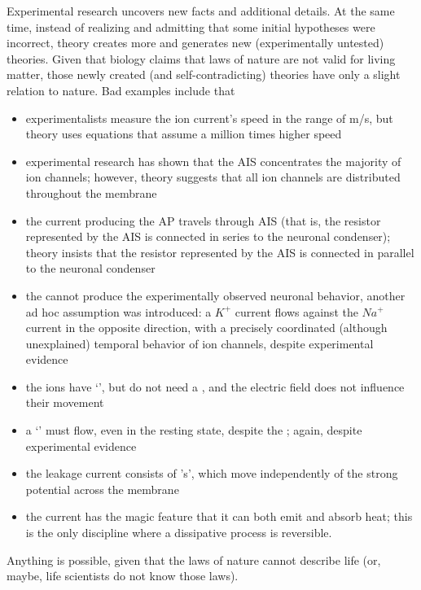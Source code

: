 Experimental research uncovers new facts and additional details. At the same time, instead of realizing and admitting that some initial hypotheses were incorrect,
theory creates more  and generates new (experimentally untested) theories. Given that biology claims that laws of nature are not valid for living matter, those newly created (and self-contradicting) theories have only a slight relation to nature. Bad examples include that
\begin{itemize}
\item experimentalists measure the ion current’s speed in the range of m/s, but theory uses equations that assume a million times higher speed
\item experimental research has shown that the \gls{AIS} concentrates the majority of ion channels; however, theory suggests that all ion channels are distributed throughout the membrane
\item the current producing the \gls{AP} travels through \gls{AIS} (that is, the resistor represented by the \gls{AIS} is connected in series to the neuronal condenser); theory insists that the resistor represented by the \gls{AIS} is connected in parallel to the neuronal condenser
\item the  cannot produce the experimentally observed neuronal behavior,
another ad hoc assumption was introduced: a $K^+$ current flows against the $Na^+$ current in the opposite direction,
 with a precisely coordinated (although unexplained) temporal behavior of ion channels, despite experimental evidence
\item the ions have ‘’, but do not need a , and the electric field does not influence their movement
\item a ‘’ must flow, even in the resting state, despite the ; again, despite experimental evidence
\item the leakage current consists of 's', which move independently of the strong potential across the membrane
\item the current has the magic feature that it can both emit and absorb heat; this is the only discipline where a dissipative process is reversible. \end{itemize}
Anything is possible, given that the laws of nature cannot describe life (or, maybe, life scientists do not know those laws).

